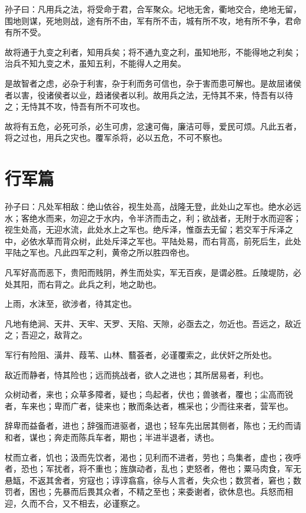 \documentclass[UTF8]{ctexart}
\begin{document}
	孙子曰：凡用兵之法，将受命于君，合军聚众。圮地无舍，衢地交合，绝地无留，围地则谋，死地则战，途有所不由，军有所不击，城有所不攻，地有所不争，君命有所不受。
	
	故将通于九变之利者，知用兵矣；将不通九变之利，虽知地形，不能得地之利矣；治兵不知九变之术，虽知五利，不能得人之用矣。
	
	是故智者之虑，必杂于利害，杂于利而务可信也，杂于害而患可解也。是故屈诸侯者以害，役诸侯者以业，趋诸侯者以利。故用兵之法，无恃其不来，恃吾有以待之；无恃其不攻，恃吾有所不可攻也。
	
	故将有五危，必死可杀，必生可虏，忿速可侮，廉洁可辱，爱民可烦。凡此五者，将之过也，用兵之灾也。覆军杀将，必以五危，不可不察也。
	
	\newpage
	\section{行军篇}
	
	孙子曰：凡处军相敌：绝山依谷，视生处高，战隆无登，此处山之军也。绝水必远水；客绝水而来，勿迎之于水内，令半济而击之，利；欲战者，无附于水而迎客；视生处高，无迎水流，此处水上之军也。绝斥泽，惟亟去无留；若交军于斥泽之中，必依水草而背众树，此处斥泽之军也。平陆处易，而右背高，前死后生，此处平陆之军也。凡此四军之利，黄帝之所以胜四帝也。
	
	凡军好高而恶下，贵阳而贱阴，养生而处实，军无百疾，是谓必胜。丘陵堤防，必处其阳，而右背之。此兵之利，地之助也。
	
	上雨，水沫至，欲涉者，待其定也。
	
	凡地有绝涧、天井、天牢、天罗、天陷、天隙，必亟去之，勿近也。吾远之，敌近之；吾迎之，敌背之。
	
	军行有险阻、潢井、葭苇、山林、蘙荟者，必谨覆索之，此伏奸之所处也。
	
	敌近而静者，恃其险也；远而挑战者，欲人之进也；其所居易者，利也。
	
	众树动者，来也；众草多障者，疑也；鸟起者，伏也；兽骇者，覆也；尘高而锐者，车来也；卑而广者，徒来也；散而条达者，樵采也；少而往来者，营军也。
	
	辞卑而益备者，进也；辞强而进驱者，退也；轻车先出居其侧者，陈也；无约而请和者，谋也；奔走而陈兵车者，期也；半进半退者，诱也。
	
	杖而立者，饥也；汲而先饮者，渴也；见利而不进者，劳也；鸟集者，虚也；夜呼者，恐也；军扰者，将不重也；旌旗动者，乱也；吏怒者，倦也；粟马肉食，军无悬缻，不返其舍者，穷寇也；谆谆翕翕，徐与人言者，失众也；数赏者，窘也；数罚者，困也；先暴而后畏其众者，不精之至也；来委谢者，欲休息也。兵怒而相迎，久而不合，又不相去，必谨察之。
	
\end{document}
